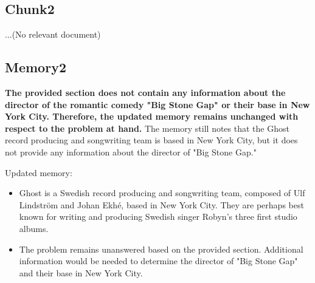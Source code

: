 \begin{tcolorbox}
\subsection*{Chunk2}
\vspace{-5pt}

...(No relevant document)
\vspace{5pt}
\subsection*{Memory2}
\vspace{-5pt}
\textbf{The provided section does not contain any information about the director of the romantic comedy "Big Stone Gap" or their base in New York City. Therefore, the updated memory remains unchanged with respect to the problem at hand.} The memory still notes that the Ghost record producing and songwriting team is based in New York City, but it does not provide any information about the director of "Big Stone Gap."

Updated memory:
\begin{itemize}
    \item Ghost is a Swedish record producing and songwriting team, composed of Ulf Lindström and Johan Ekhé, based in New York City. They are perhaps best known for writing and producing Swedish singer Robyn's three first studio albums.
    \item The problem remains unanswered based on the provided section. Additional information would be needed to determine the director of "Big Stone Gap" and their base in New York City.
\end{itemize}

\end{tcolorbox}